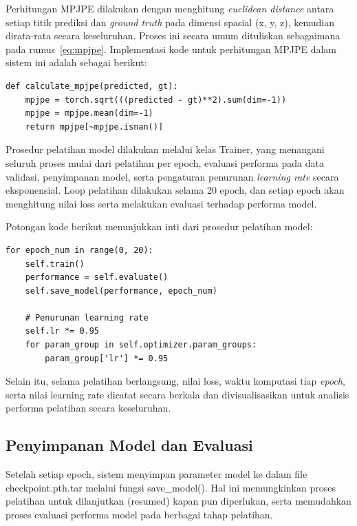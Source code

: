 Perhitungan MPJPE dilakukan dengan menghitung \textit{euclidean distance} antara setiap titik prediksi dan \textit{ground truth} pada dimensi spasial (x, y, z), kemudian dirata-rata secara keseluruhan. Proses ini secara umum dituliskan sebagaimana pada rumus~\ref{eq:mpjpe}. Implementasi kode untuk perhitungan MPJPE dalam sistem ini adalah sebagai berikut:

\begin{lstlisting}[style=plainbox, caption={Fungsi perhitungan MPJPE}, label={lst:calculate_mpjpe}]
def calculate_mpjpe(predicted, gt):
    mpjpe = torch.sqrt(((predicted - gt)**2).sum(dim=-1))
    mpjpe = mpjpe.mean(dim=-1)
    return mpjpe[~mpjpe.isnan()]
\end{lstlisting}

Prosedur pelatihan model dilakukan melalui kelas {Trainer}, yang menangani seluruh proses mulai dari pelatihan per epoch, evaluasi performa pada data validasi, penyimpanan model, serta pengaturan penurunan \textit{learning rate} secara eksponensial. Loop pelatihan dilakukan selama 20 epoch, dan setiap epoch akan menghitung nilai loss serta melakukan evaluasi terhadap performa model.

Potongan kode berikut menunjukkan inti dari prosedur pelatihan model:

\begin{lstlisting}[style=plainbox, caption={Loop pelatihan model DeciWatch}, label={lst:training_loop}]
for epoch_num in range(0, 20):
    self.train()
    performance = self.evaluate()
    self.save_model(performance, epoch_num)

    # Penurunan learning rate
    self.lr *= 0.95
    for param_group in self.optimizer.param_groups:
        param_group['lr'] *= 0.95
\end{lstlisting}

Selain itu, selama pelatihan berlangsung, nilai loss, waktu komputasi tiap \textit{epoch}, serta nilai learning rate dicatat secara berkala dan divisualisasikan untuk analisis performa pelatihan secara keseluruhan.

\subsection{Penyimpanan Model dan Evaluasi}

Setelah setiap epoch, sistem menyimpan parameter model ke dalam file {checkpoint.pth.tar} melalui fungsi {save\_model()}. Hal ini memungkinkan proses pelatihan untuk dilanjutkan (resumed) kapan pun diperlukan, serta memudahkan proses evaluasi performa model pada berbagai tahap pelatihan.


